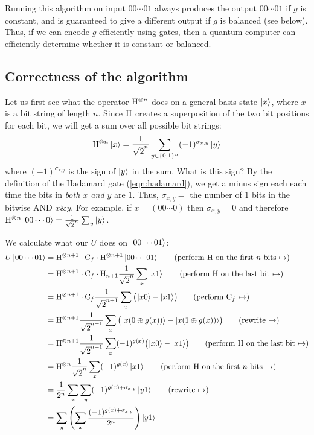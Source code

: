 Running this algorithm on input $00\cdots01$ always produces the output $00\cdots01$ if $g$ is constant,
and is guaranteed to give a different output if $g$ is balanced (see below).
Thus, if we can encode $g$ efficiently using gates, then a quantum computer can efficiently determine whether it is constant or balanced.

\subsection{Correctness of the algorithm}

Let us first see what the operator $\mathrm{H}^{\otimes n}$ does on a general basis state $\ket{x}$, where $x$ is a bit string of length $n$.
Since $\mathrm{H}$ creates a superposition of the two bit positions for each bit, we will get a sum over all possible bit strings:
\begin{align*}
  \mathrm{H}^{\otimes n} \ket{x} = \frac{1}{\sqrt{2}^n} \sum_{y \in \{0,1\}^n} (-1)^{\sigma_{x,y}} \ket{y}
\end{align*}
where $(-1)^{\sigma_{x,y}}$ is the sign of $\ket{y}$ in the sum.
What is this sign?
By the definition of the Hadamard gate (\ref{eqn:hadamard}), we get a minus sign each each time the bits in \emph{both $x$ and $y$} are $1$.
Thus, $\sigma_{x,y} =$ the number of $1$ bits in the bitwise AND $x \& y$.
For example, if $x = (00\cdots0)$ then $\sigma_{x,y} = 0$ and therefore $\mathrm{H}^{\otimes n} \ket{00\cdots0} = \frac{1}{\sqrt{2}^n} \sum_y \ket{y}$.

\newcommand{\nexttag}[1]{\tag{#1 $\mapsto$}}

We calculate what our $U$ does on $\ket{00\cdots01}$:
\begin{align*}
  U\ket{00\cdots01} &= \Ha^{\otimes n+1} \cdot \Cl_f \cdot \Ha^{\otimes n+1} \ket{00\cdots01} \nexttag{perform $\Ha$ on the first $n$ bits}\\
  &= \Ha^{\otimes n+1} \cdot \Cl_f \cdot \Ha_{n+1} \frac{1}{\sqrt{2}^n} \sum_x \ket{x1} \nexttag{perform $\Ha$ on the last bit}\\
  &= \Ha^{\otimes n+1} \cdot \Cl_f \frac{1}{\sqrt{2}^{n+1}} \sum_x \kets{\ket{x0} - \ket{x1}} \nexttag{perform $\Cl_f$}\\
  &= \Ha^{\otimes n+1} \frac{1}{\sqrt{2}^{n+1}} \sum_x \kets{\ket{x(0 \oplus g(x))} - \ket{x(1 \oplus g(x))}} \nexttag{rewrite}\\
  &= \Ha^{\otimes n+1} \frac{1}{\sqrt{2}^{n+1}} \sum_x (-1)^{g(x)}\kets{\ket{x0} - \ket{x1}} \nexttag{perform $\Ha$ on the last bit}\\
  &= \Ha^{\otimes n} \frac{1}{\sqrt{2}^{n}} \sum_x (-1)^{g(x)}\ket{x1} \nexttag{perform $\Ha$ on the first $n$ bits}\\
  &= \frac{1}{2^n} \sum_x \sum_y (-1)^{g(x)+\sigma_{x,y}}\ket{y1} \nexttag{rewrite}\\
  &= \sum_y \left(\sum_x \frac{(-1)^{g(x)+\sigma_{x,y}}}{2^n}\right)\ket{y1}
\end{align*}

